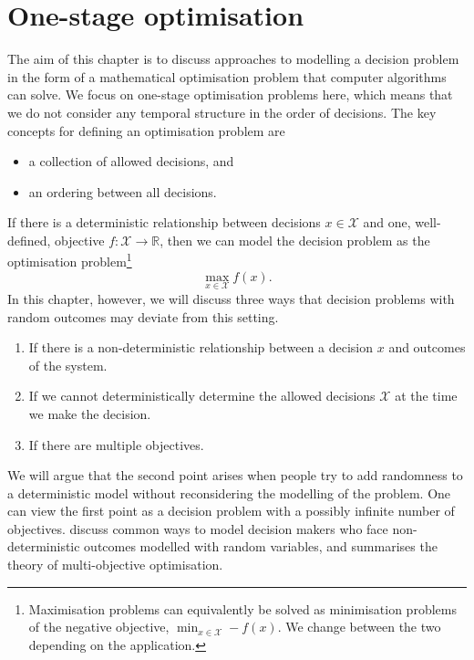 \documentclass[main.tex]{subfiles}
\begin{document}
\chtodolist{} %

\chapter{One-stage optimisation}\label{ch:onestage}

The aim of this chapter is to discuss approaches to modelling a
decision problem in the form of a mathematical optimisation problem
that computer algorithms can solve.
We focus on one-stage optimisation problems here, which means that
we do not consider any temporal structure in the order of decisions.
The key concepts for defining an optimisation problem are
\begin{itemize}
\item a
  collection of allowed decisions, and
\item an ordering between all
  decisions.
\end{itemize}

If there is a deterministic relationship between decisions
$x\in\mathcal{X}$ and one, well-defined, objective
$f:\mathcal{X}\to\mathbb{R}$, then we can model the decision problem
as the optimisation problem\footnote{Maximisation problems can
  equivalently be solved as minimisation problems of the negative
  objective, $\min_{x\in\mathcal{X}}-f(x)$. We change between the two
  depending on the application.}
\begin{equation}\label{eq:deterministic_setting}
  \max_{x\in\mathcal{X}} f(x).
\end{equation}
In this chapter, however, we will discuss three ways that
decision problems with random outcomes may deviate from this setting.
\begin{enumerate}
\item If there is a non-deterministic relationship between a decision
  $x$ and outcomes of the system.
\item If we cannot  deterministically determine the allowed decisions
  $\mathcal{X}$ at the time we make the decision.
\item If there are multiple objectives.
\end{enumerate}
We will argue that the second point arises when people try to add
randomness to a deterministic model without reconsidering the
modelling of the problem. One can view the first point as a decision
problem with a possibly infinite number of objectives.
discuss common ways to model decision makers who face
non-deterministic outcomes modelled with random variables, and
 summarises the theory of multi-objective
optimisation.
\end{document}
